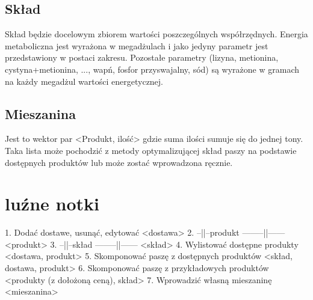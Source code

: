 \documentclass[shortabstract]{iithesis}
\begin{document}
\section{Skład}

Skład będzie docelowym zbiorem wartości poszczególnych współrzędnych. Energia metaboliczna jest wyrażona w megadżulach i jako jedyny parametr jest przedstawiony w postaci zakresu. Pozostałe parametry (lizyna, metionina, cystyna+metionina, ..., wapń, fosfor przyswajalny, sód) są wyrażone w gramach na każdy megadżul wartości energetycznej.


\section{Mieszanina}

Jest to wektor par <Produkt, ilość> gdzie suma ilości sumuje się do jednej tony. Taka lista może pochodzić z metody optymalizującej skład paszy na podstawie dostępnych produktów lub może zostać wprowadzona ręcznie. 

\chapter{luźne notki}

1. Dodać dostawe, usunąć, edytować <dostawa>
2. --||--produkt  --------||------ <produkt>
3. --||--skład  --------||------ <skład>
4. Wylistować dostępne produkty <dostawa, produkt>
5. Skomponować paszę z dostępnych produktów <skład, dostawa, produkt>
6. Skomponować paszę z przykładowych produktów <produkty (z dołożoną ceną), skład>
7. Wprowadzić własną mieszaninę <mieszanina> 






\end{document}

